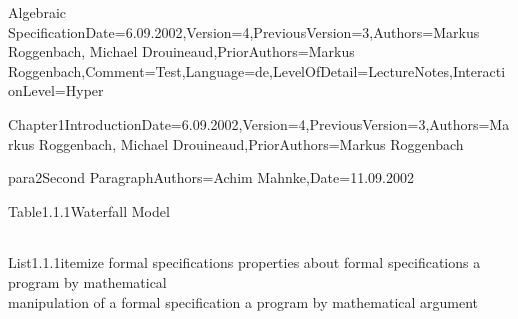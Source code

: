 \documentclass[landscape, slides, light]{mmiss2}
\begin{document}
\begin{Package}{Algebraic
Specification}{Date=6.09.2002,Version=4,PreviousVersion=3,Authors={Markus
Roggenbach, Michael Drouineaud},PriorAuthors={Markus
Roggenbach},Comment=Test,Language=de,LevelOfDetail=LectureNotes,InteractionLevel=Hyper}
\begin{Section}{Chapter1}{Introduction}{Date=6.09.2002,Version=4,PreviousVersion=3,Authors={Markus
Roggenbach, Michael Drouineaud},PriorAuthors={Markus Roggenbach}}
\begin{Paragraph}[]{para2}{Second Paragraph}{Authors=Achim Mahnke,Date=11.09.2002}
\begin{Table}[LaTeX]{Table1.1.1}{Waterfall Model}{}
{\begin{center}
\begin{tabular}{lcl}
\end{tabular}
\end{center}
}
\end{Table}
\begin{List}{List1.1.1}{itemize}{}
\ListItem{}
{ formal specifications}
\ListItem{}
{ properties about formal specifications}
\ListItem{}
{ a program by mathematical \\
            manipulation of a formal specification}
\ListItem{}
{ a program by mathematical argument}
\end{List}
\end{Paragraph}
\end{Section}
\end{Package}
\end{document}
